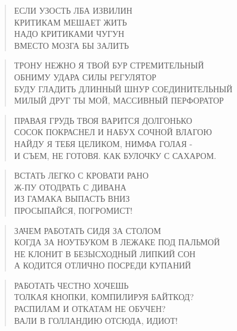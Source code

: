 \poemtitle{***}
\begin{verse}
ЕСЛИ УЗОСТЬ ЛБА ИЗВИЛИН\\
КРИТИКАМ МЕШАЕТ ЖИТЬ\\
НАДО КРИТИКАМИ ЧУГУН\\
ВМЕСТО МОЗГА БЫ ЗАЛИТЬ
\end{verse}

\poemtitle{***}
\begin{verse}
ТРОНУ НЕЖНО Я ТВОЙ БУР СТРЕМИТЕЛЬНЫЙ\\
ОБНИМУ УДАРА СИЛЫ РЕГУЛЯТОР\\
БУДУ ГЛАДИТЬ ДЛИННЫЙ ШНУР СОЕДИНИТЕЛЬНЫЙ\\
МИЛЫЙ ДРУГ ТЫ МОЙ, МАССИВНЫЙ ПЕРФОРАТОР
\end{verse}

\poemtitle{***}
\begin{verse}
ПРАВАЯ ГРУДЬ ТВОЯ ВАРИТСЯ ДОЛГОНЬКО\\
СОСОК ПОКРАСНЕЛ И НАБУХ СОЧНОЙ ВЛАГОЮ\\
НАЙДУ Я ТЕБЯ ЦЕЛИКОМ, НИМФА ГОЛАЯ - \\
И СЪЕМ, НЕ ГОТОВЯ. КАК БУЛОЧКУ С САХАРОМ.
\end{verse}

\poemtitle{***}
\begin{verse}
ВСТАТЬ ЛЕГКО С КРОВАТИ РАНО\\
Ж-ПУ ОТОДРАТЬ С ДИВАНА\\
ИЗ ГАМАКА ВЫПАСТЬ ВНИЗ\\
ПРОСЫПАЙСЯ, ПОГРОМИСТ!
\end{verse}

\poemtitle{***}
\begin{verse}
ЗАЧЕМ РАБОТАТЬ СИДЯ ЗА СТОЛОМ\\
КОГДА ЗА НОУТБУКОМ В ЛЕЖАКЕ ПОД ПАЛЬМОЙ\\
НЕ КЛОНИТ В БЕЗЫСХОДНЫЙ ЛИПКИЙ СОН\\
А КОДИТСЯ ОТЛИЧНО ПОСРЕДИ КУПАНИЙ
\end{verse}

\poemtitle{***}
\begin{verse}
РАБОТАТЬ ЧЕСТНО ХОЧЕШЬ \\
ТОЛКАЯ КНОПКИ, КОМПИЛИРУЯ БАЙТКОД?\\
РАСПИЛАМ И ОТКАТАМ НЕ ОБУЧЕН?\\
ВАЛИ В ГОЛЛАНДИЮ ОТСЮДА, ИДИОТ!
\end{verse}

